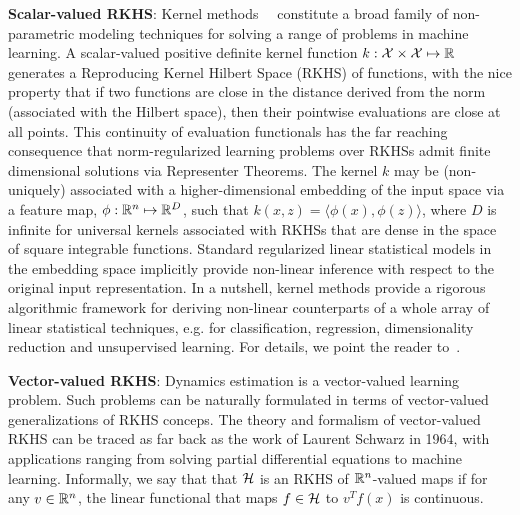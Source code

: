 {\bf Scalar-valued RKHS}: Kernel methods~~\cite{ScholkoepfSmola2001} constitute a broad family of non-parametric modeling techniques for solving a range of problems in machine learning. A scalar-valued positive definite kernel function $k : \mathcal{X} \times \mathcal{X} \mapsto \mathbb{R}$ generates a Reproducing Kernel Hilbert Space (RKHS) of functions, with the nice property that if two functions are close in the distance derived from the norm (associated with the Hilbert space), then their pointwise evaluations are close at all points. This continuity of evaluation functionals has the far reaching consequence that norm-regularized learning problems over RKHSs admit finite dimensional solutions via Representer Theorems. The kernel $k$ may be (non-uniquely) associated with a higher-dimensional embedding of the input space via a feature map, $\phi: \mathbb{R}^n \mapsto \mathbb{R}^D$, such that $k(x, z) = \langle \phi(x), \phi(z)\rangle$, where $D$ is infinite for universal kernels associated with RKHSs that are dense in the space of square integrable functions. Standard regularized linear statistical models in the embedding space implicitly provide non-linear inference with respect to the original input representation.  In a nutshell, kernel methods provide a rigorous algorithmic framework for deriving non-linear counterparts of a whole array of linear statistical techniques, e.g. for classification, regression, dimensionality reduction and unsupervised learning. For details, we point the reader to~\cite{HearstDumaisEtAl1998}.


{\bf Vector-valued RKHS}: Dynamics estimation is a vector-valued learning problem. Such problems can be naturally formulated in terms of  vector-valued generalizations of RKHS conceps. The theory and formalism of vector-valued RKHS can be traced as far back as the work of Laurent Schwarz in 1964, with applications ranging from solving partial differential equations to machine learning. Informally, we say that that ${\cal H}$ is an RKHS of $\mathbb{R}^n$-valued maps if for any $v\in \mathbb{R}^n$, the linear functional that maps $f \in {\cal H}$ to $v^T f(x)$ is continuous.

